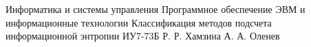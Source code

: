 \documentclass{bmstu}
\begin{document}
\makeresearchtitle
	{Информатика и системы управления}
	{Программное обеспечение ЭВМ и информационные технологии}
	{Классификация методов подсчета\\информационной энтропии}
	{ИУ7-73Б}
	{Р. Р. Хамзина}
	{А. А. Оленев}{}{}
	
\setcounter{page}{3}



\maketableofcontents







\makebibliography


\end{document}
